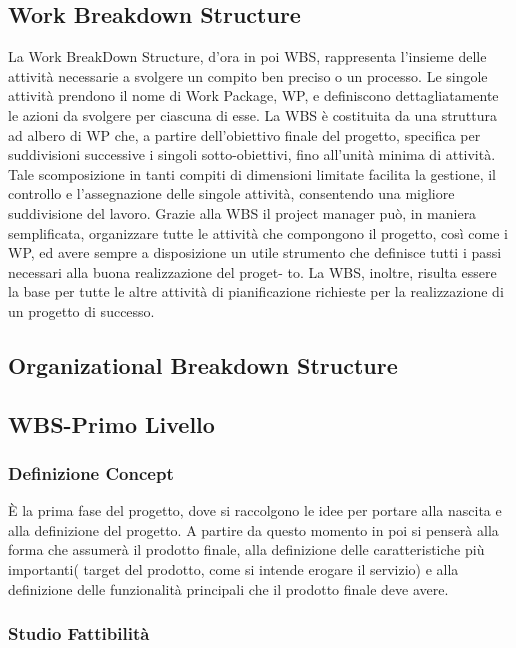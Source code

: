 \subsection{Work Breakdown Structure}

La Work BreakDown Structure, d’ora in poi WBS, rappresenta l’insieme delle attività
necessarie a svolgere un compito ben preciso o un processo. Le singole attività prendono
il nome di Work Package, WP, e definiscono dettagliatamente le azioni da svolgere per
ciascuna di esse.
La WBS è costituita da una struttura ad albero di WP che, a partire dell’obiettivo finale
del progetto, specifica per suddivisioni successive i singoli sotto-obiettivi, fino all’unità
minima di attività.
Tale scomposizione in tanti compiti di dimensioni limitate facilita la gestione, il controllo
e l’assegnazione delle singole attività, consentendo una migliore suddivisione del lavoro.
Grazie alla WBS il project manager può, in maniera semplificata, organizzare tutte le
attività che compongono il progetto, così come i WP, ed avere sempre a disposizione un
utile strumento che definisce tutti i passi necessari alla buona realizzazione del proget-
to. La WBS, inoltre, risulta essere la base per tutte le altre attività di pianificazione
richieste per la realizzazione di un progetto di successo.

\subsection{Organizational Breakdown Structure}
\subsection{WBS-Primo Livello}
\subsubsection{Definizione Concept}

È la prima fase del progetto, dove si raccolgono le idee per portare alla nascita e alla definizione del progetto. A partire da questo momento in poi si penserà alla forma che assumerà il prodotto finale, alla  definizione delle caratteristiche più importanti( target del prodotto, come si intende erogare il servizio) e alla definizione delle funzionalità principali che il prodotto finale deve avere. 


 \subsubsection{Studio Fattibilità }

